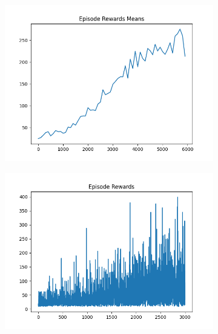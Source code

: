 \begin{figure}[H]
    \centering
    \begin{subfigure}{.47\linewidth}
        \centering
        \includegraphics[width=\textwidth]{pole/2024-06-13_22-09-48_dqn_cartpole_episode_rewards_means.png}
    \end{subfigure}
    \begin{subfigure}{.47\linewidth}
        \centering
        \includegraphics[width=\textwidth]{pole/2024-06-13_19-11-27_dqn_cartpole_episode_rewards.png}
    \end{subfigure}
    \begin{subfigure}{.47\linewidth}
        \centering

\end{subfigure}
\end{figure}
